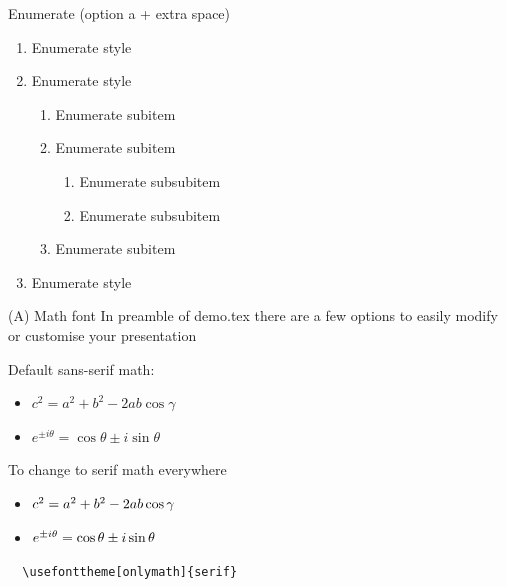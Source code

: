 \documentclass[10pt,t]{beamer}
\begin{document}
\begin{frame}{Enumerate}
(option a + extra space)
\begin{enumerate}[a\enspace]
	\item Enumerate style
	\item Enumerate style
	\begin{enumerate}[a\enspace]
		\item Enumerate subitem
		\item Enumerate subitem
		\begin{enumerate}[a\enspace]
			\item Enumerate subsubitem
			\item Enumerate subsubitem
		\end{enumerate}
		\item Enumerate subitem
	\end{enumerate}
	\item Enumerate style
\end{enumerate}
\end{frame}








\begin{frame}[fragile]{(A) Math font}
In preamble of demo.tex there are a few options to easily modify or customise your presentation 

\medskip
Default sans-serif math:
    \begin{itemize}
        \item $ c^2 = a^2+b^2 - 2ab \cos\gamma $
        \item $e^{ \pm i\theta } = \cos \theta \pm i\sin \theta$
    \end{itemize}

\medskip
To change to serif math everywhere

    \begin{itemize}
        \item $ \mathnormal{c^\mathrm{2} = a^\mathrm{2}+b^\mathrm{2} - \mathrm{2}ab \cos\gamma} $
        \item $\mathnormal{e^{ \pm i\theta } = \cos \theta \pm i\sin \theta}$
    \end{itemize}
\medskip
\verb+  \usefonttheme[onlymath]{serif}+

\end{frame}
\end{document}
